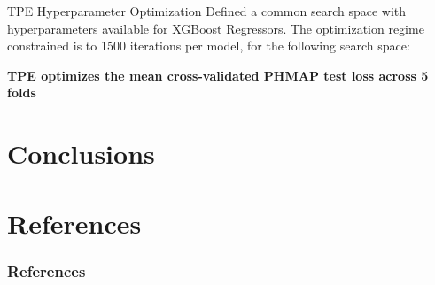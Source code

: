 \documentclass{beamer}
\begin{document}
        \begin{frame}{TPE Hyperparameter Optimization}
            Defined a common search space with hyperparameters available for XGBoost Regressors. The optimization regime constrained is to 1500 iterations per model, for the following search space:

            \begin{table}[!htbp]
                \centering
            \end{table}

            \textbf{TPE optimizes the mean cross-validated PHMAP test loss across 5 folds}

        \end{frame}

    \section{Conclusions}

    \section*{References}
        \begin{frame}[allowframebreaks]
            \frametitle{References}
            \printbibliography
        \end{frame}
\end{document}
